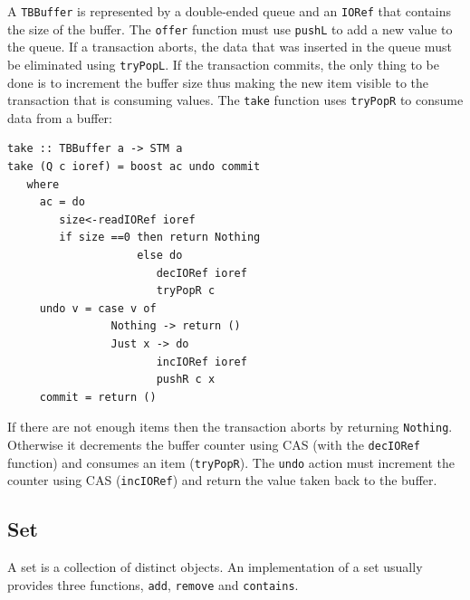 \documentclass{llncs}
\begin{document}
A {\tt TBBuffer} is represented by a double-ended queue and an {\tt IORef} that contains
the size of the buffer. The {\tt offer} function must use
{\tt pushL} to add a new value to the queue. If a transaction aborts, the data
that was inserted in the queue must be eliminated using  {\tt tryPopL}.
If the transaction commits, the only thing to be done is to increment the buffer size thus
making the new item visible to the transaction that is consuming values.
The {\tt take} function uses {\tt tryPopR} to consume data from a buffer:

{\small\begin{verbatim}
take :: TBBuffer a -> STM a
take (Q c ioref) = boost ac undo commit
   where
     ac = do
        size<-readIORef ioref
        if size ==0 then return Nothing
                    else do
                       decIORef ioref
                       tryPopR c
     undo v = case v of
                Nothing -> return ()
                Just x -> do
                       incIORef ioref
                       pushR c x
     commit = return ()
\end{verbatim}}

If there are not enough items then the transaction aborts by returning {\tt Nothing}.
Otherwise it decrements the buffer counter using CAS (with the {\tt decIORef} function)
and consumes an item ({\tt tryPopR}). The {\tt undo} action must increment the counter
using CAS ({\tt incIORef}) and return the value taken back to the buffer.

\subsection{Set}
\label{sec:set}

A set is a collection of distinct objects. An implementation of a set usually provides
three functions, {\tt add}, {\tt remove} and {\tt contains}.
\end{document}
